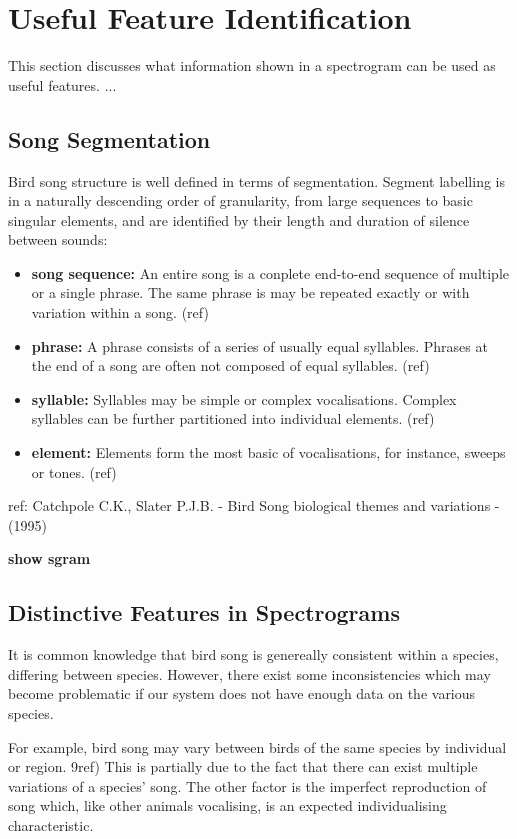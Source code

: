 \section{Useful Feature Identification}
This section discusses what information shown in a spectrogram can be used as
useful features. ...

\subsection{Song Segmentation}
Bird song structure is well defined in terms of segmentation.
Segment labelling is in a naturally descending order of granularity, from
large sequences to basic singular elements, and are identified by their length
and duration of silence between sounds:
\begin{itemize}
  \item \textbf{song sequence:}
    An entire song is a conplete end-to-end sequence of multiple or a single
    phrase.
    The same phrase is may be repeated exactly or with variation within a
    song. (ref)
  \item \textbf{phrase:}
    A phrase consists of a series of usually equal syllables.
    Phrases at the end of a song are often not composed of equal syllables. (ref)
  \item \textbf{syllable:}
    Syllables may be simple or complex vocalisations.
    Complex syllables can be further partitioned into individual elements. (ref)
  \item \textbf{element:}
    Elements form the most basic of vocalisations, for instance, sweeps or tones. (ref)
\end{itemize}

ref: Catchpole C.K., Slater P.J.B. - Bird Song biological themes and variations - (1995)

\textbf{show sgram}

\subsection{Distinctive Features in Spectrograms}
It is common knowledge that bird song is genereally consistent within a species,
differing between species.
However, there exist some inconsistencies which may become problematic if our
system does not have enough data on the various species.

For example, bird song may vary between birds of the same species by individual
or region. 9ref)
This is partially due to the fact that there can exist multiple variations of a
species' song.
The other factor is the imperfect reproduction of song which, like other animals
vocalising, is an expected individualising characteristic.


